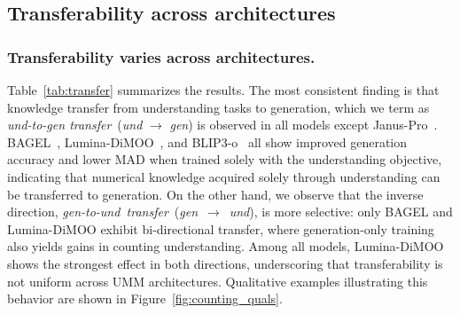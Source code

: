 \vspace{-10pt}
\subsection{\textbf{Transferability across architectures}}
\subsubsection{Transferability varies across architectures.}
Table~\ref{tab:transfer} summarizes the results. The most consistent finding is that knowledge transfer from understanding tasks to generation, which we term as \textit{und-to-gen transfer}~(\textit{und} $\rightarrow$ \textit{gen}) is observed in all models except Janus-Pro~\cite{chen2025januspro}. BAGEL~\cite{deng2025bagel}, Lumina-DiMOO~\cite{xin2025lumina}, and \mbox{BLIP3-o~\cite{chen2505blip3}} all show improved generation accuracy and lower MAD when trained solely with the understanding objective, indicating that numerical knowledge acquired solely through understanding can be transferred to generation. On the other hand, we observe that the inverse direction, \mbox{\textit{gen-to-und transfer}~(\textit{gen} $\rightarrow$ \textit{und}),} is more selective: only BAGEL and Lumina-DiMOO exhibit bi-directional transfer, where generation-only training also yields gains in counting understanding. Among all models, Lumina-DiMOO shows the strongest effect in both directions, underscoring that transferability is not uniform across UMM architectures.  Qualitative examples illustrating this behavior are shown in Figure~\ref{fig:counting_quals}.

\vspace{-10pt}
